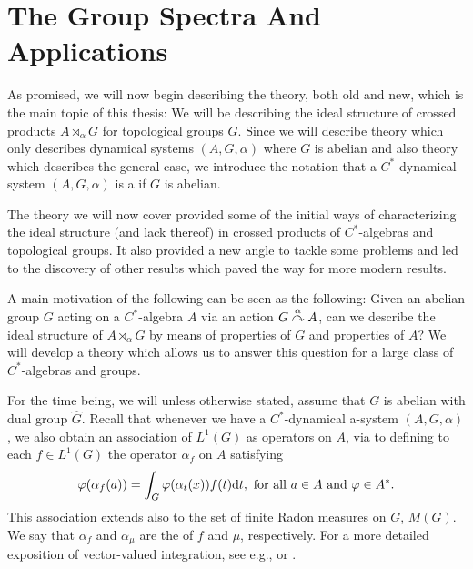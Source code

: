 \chapter{The Group Spectra And Applications}
As promised, we will now begin describing the theory, both old and new, which is the main topic of this thesis: We will be describing the ideal structure of crossed products $A \rtimes_\alpha G$ for topological groups $G$. Since we will describe theory which only describes dynamical systems $(A,G,\alpha)$ where $G$ is abelian and also theory which describes the general case, we introduce the notation that a $C^*$-dynamical system $(A, G, \alpha)$ is a  if $G$ is abelian. 

The theory we will now cover provided some of the initial ways of characterizing the ideal structure (and lack thereof) in crossed products of $C^*$-algebras and topological groups. It also provided a new angle to tackle some problems and led to the discovery of other results which paved the way for more modern results. 

A main motivation of the following can be seen as the following: Given an abelian group $G$ acting on a $C^*$-algebra $A$ via an action $G \stackrel{\alpha}{\curvearrowright} A$, can we describe the ideal structure of $A \rtimes_\alpha G$ by means of properties of $G$ and properties of $A$? We will develop a theory which allows us to answer this question for a large class of $C^*$-algebras and groups.

For the time being, we will unless otherwise stated, assume that $G$ is abelian with dual group $\hat G$. Recall that whenever we have a $C^*$-dynamical a-system $(A, G, \alpha)$, we also obtain an association of $L^1(G)$ as operators on $A$, via to defining to each $f \in L^1(G)$ the operator $\alpha_f$ on $A$ satisfying
\begin{align*}
	\varphi(\alpha_f(a)) = \int_G \varphi(\alpha_t(x)) f(t) \mathrm{d} t, \text{ for all } a \in A \text{ and } \varphi \in A^*.
\end{align*}
This association extends also to the set of finite Radon measures on $G$, $M(G)$. We say that $\alpha_f$ and $\alpha_\mu$ are the  of $f$ and $\mu$, respectively. For a more detailed exposition of vector-valued integration, see e.g., \cite[Appendix 3, Lemma 7.4.4]{pedersenalgauto} or \cite[Appendix A.3]{folland2016fourier}.

